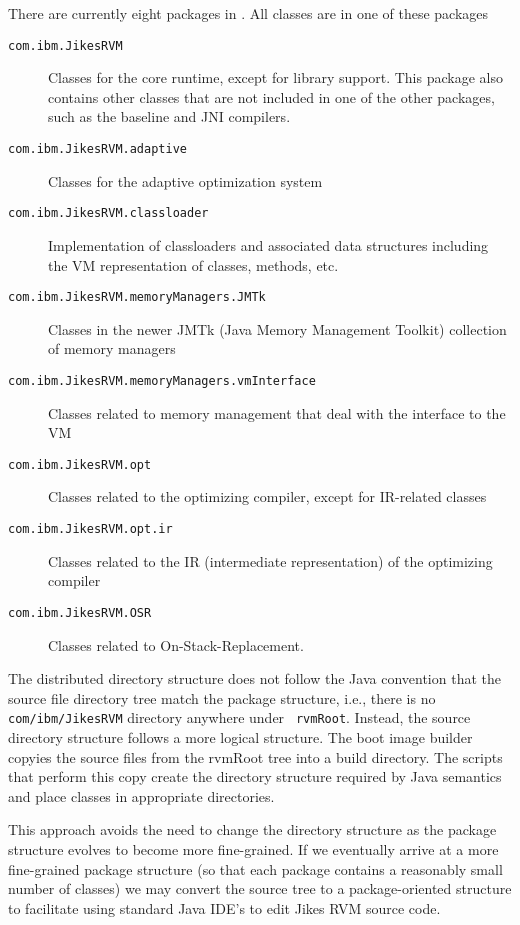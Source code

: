 There are currently eight packages in \jrvm. All classes are in
one of these packages
\begin{description}
\item[\texttt{com.ibm.JikesRVM}] Classes for the core runtime, except for library
support.  This package also contains other classes that are not
included in one of the other packages, such as the baseline and JNI
compilers. 

\item[\texttt{com.ibm.JikesRVM.adaptive}] Classes for the adaptive optimization system

\item[\texttt{com.ibm.JikesRVM.classloader}] Implementation of classloaders
and associated data structures including the VM representation of classes,
methods, etc. 

\item[\texttt{com.ibm.JikesRVM.memoryManagers.JMTk}] Classes in the newer JMTk
(Java\TMweb{} Memory Management Toolkit) collection of memory managers

\item[\texttt{com.ibm.JikesRVM.memoryManagers.vmInterface}] Classes related to
memory management that deal with the interface to the VM

\item[\texttt{com.ibm.JikesRVM.opt}] Classes related to the optimizing
compiler, except for IR-related classes

\item[\texttt{com.ibm.JikesRVM.opt.ir}] Classes related to the IR
(intermediate representation) of the optimizing compiler

\item[\texttt{com.ibm.JikesRVM.OSR}] Classes related to On-Stack-Replacement. 

\end{description}

The distributed directory structure
does not follow the Java convention that the source file directory tree
match the package structure, i.e.,
there is no {\tt com/ibm/JikesRVM} directory anywhere under {\tt
rvmRoot}.  Instead, the source directory structure follows a more logical 
structure.  The boot image builder
copyies the source files from the rvmRoot tree into a build
directory.  The scripts that perform this copy create the directory
structure required by Java semantics and place classes in appropriate
directories.

This approach avoids the need to change the directory structure as the
package structure evolves to become more fine-grained. If we
eventually arrive at a more fine-grained package structure (so that
each package contains a reasonably small number of classes) we may
convert the source tree to a package-oriented structure to facilitate
using standard Java IDE's to edit Jikes RVM source code.
